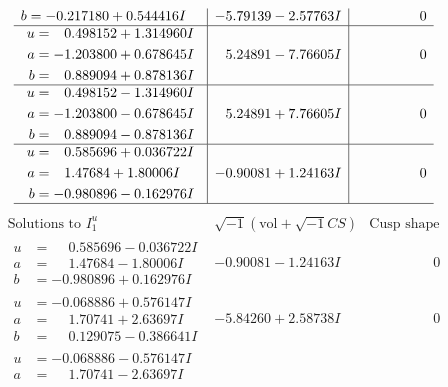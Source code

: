 \documentclass[1p]{elsarticle_modified}
\theoremstyle{definition}
\newcommand{\I}{\sqrt{-1}}
\begin{document}
$$\begin{array}{c|c|c}
\begin{aligned}
b &= -0.217180 + 0.544416 I\end{aligned}
 & -5.79139 - 2.57763 I & \phantom{-0.000000 } 0 \\ \hline\begin{aligned}
u &= \phantom{-}0.498152 + 1.314960 I \\
a &= -1.203800 + 0.678645 I \\
b &= \phantom{-}0.889094 + 0.878136 I\end{aligned}
 & \phantom{-}5.24891 - 7.76605 I & \phantom{-0.000000 } 0 \\ \hline\begin{aligned}
u &= \phantom{-}0.498152 - 1.314960 I \\
a &= -1.203800 - 0.678645 I \\
b &= \phantom{-}0.889094 - 0.878136 I\end{aligned}
 & \phantom{-}5.24891 + 7.76605 I & \phantom{-0.000000 } 0 \\ \hline\begin{aligned}
u &= \phantom{-}0.585696 + 0.036722 I \\
a &= \phantom{-}1.47684 + 1.80006 I \\
b &= -0.980896 - 0.162976 I\end{aligned}
 & -0.90081 + 1.24163 I & \phantom{-0.000000 } 0\\
 \hline 
 \end{array}$$\newpage$$\begin{array}{c|c|c}  
\text{Solutions to }I^u_{1}& \I (\text{vol} + \sqrt{-1}CS) & \text{Cusp shape}\\
 \hline 
\begin{aligned}
u &= \phantom{-}0.585696 - 0.036722 I \\
a &= \phantom{-}1.47684 - 1.80006 I \\
b &= -0.980896 + 0.162976 I\end{aligned}
 & -0.90081 - 1.24163 I & \phantom{-0.000000 } 0 \\ \hline\begin{aligned}
u &= -0.068886 + 0.576147 I \\
a &= \phantom{-}1.70741 + 2.63697 I \\
b &= \phantom{-}0.129075 - 0.386641 I\end{aligned}
 & -5.84260 + 2.58738 I & \phantom{-0.000000 } 0 \\ \hline\begin{aligned}
u &= -0.068886 - 0.576147 I \\
a &= \phantom{-}1.70741 - 2.63697 I \\

\end{aligned}
\end{array}$$
\end{document}
